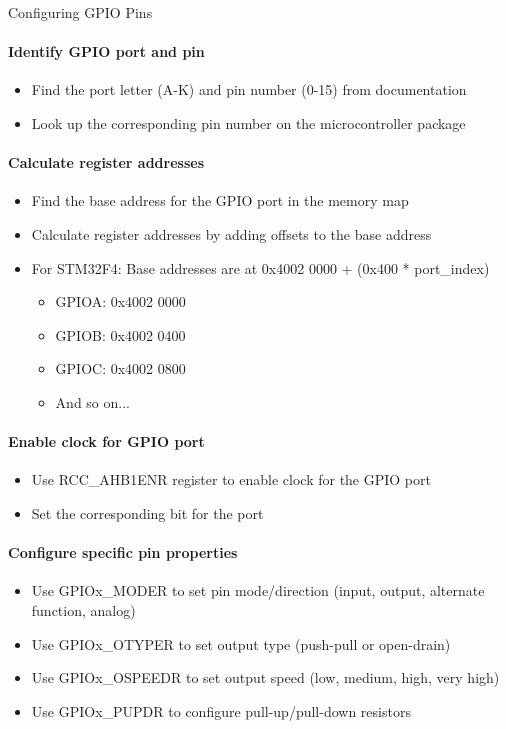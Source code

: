\begin{KR}{Configuring GPIO Pins}
\paragraph{Identify GPIO port and pin}
\begin{itemize}
    \item Find the port letter (A-K) and pin number (0-15) from documentation
    \item Look up the corresponding pin number on the microcontroller package
\end{itemize}

\paragraph{Calculate register addresses}
\begin{itemize}
    \item Find the base address for the GPIO port in the memory map
    \item Calculate register addresses by adding offsets to the base address
    \item For STM32F4: Base addresses are at 0x4002 0000 + (0x400 * port\_index)
    \begin{itemize}
        \item GPIOA: 0x4002 0000
        \item GPIOB: 0x4002 0400
        \item GPIOC: 0x4002 0800
        \item And so on...
    \end{itemize}
\end{itemize}

\paragraph{Enable clock for GPIO port}
\begin{itemize}
    \item Use RCC\_AHB1ENR register to enable clock for the GPIO port
    \item Set the corresponding bit for the port
\end{itemize}

\paragraph{Configure specific pin properties}
\begin{itemize}
    \item Use GPIOx\_MODER to set pin mode/direction (input, output, alternate function, analog)
    \item Use GPIOx\_OTYPER to set output type (push-pull or open-drain)
    \item Use GPIOx\_OSPEEDR to set output speed (low, medium, high, very high)
    \item Use GPIOx\_PUPDR to configure pull-up/pull-down resistors
\end{itemize}


\end{KR}
